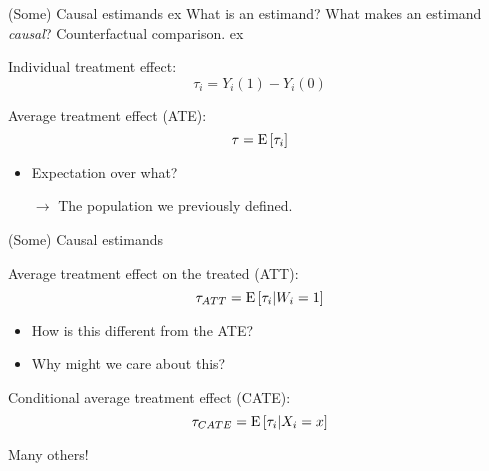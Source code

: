 \documentclass[xcolor={dvipsnames}, handout]{beamer}
\begin{document}

\begin{frame}{(Some) Causal estimands}
 ex
\pause
What is an estimand? \pause What makes an estimand \textit{causal}? \pause Counterfactual comparison.  
 ex
\pause
\begin{wideitemize}
\item Individual treatment effect: \[\tau_i = Y_i(1) - Y_i(0)\]\pause
\item Average treatment effect (ATE): \[\tau = {\textrm E}\,[\tau_i]\] \pause 
\begin{itemize}
\item Expectation over what?\pause
\item[$\rightarrow$] The population we previously defined.
\end{itemize}
\end{wideitemize}

\end{frame}



\begin{frame}{(Some) Causal estimands}

\begin{wideitemize}
\item Average treatment effect on the treated (ATT): \[\tau_{ATT} = {\textrm E}\,[\tau_i | W_i = 1]\] \pause
\begin{itemize}
\item How is this different from the ATE?
\item Why might we care about this?
\end{itemize}\pause
\item Conditional average treatment effect (CATE): \[\tau_{CATE} = {\textrm E}\,[\tau_i | X_i = x]\] \pause
\end{wideitemize}

\centering
Many others!

\end{frame}
\end{document}
